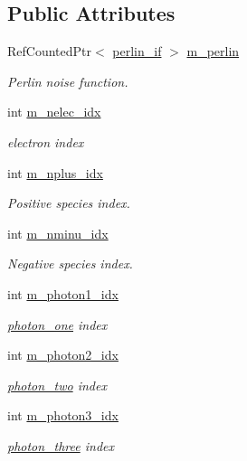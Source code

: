 \subsection*{Public Attributes}
\begin{DoxyCompactItemize}
\item 
Ref\+Counted\+Ptr$<$ \hyperlink{classperlin__if}{perlin\+\_\+if} $>$ \hyperlink{classmorrow__lowke_a50cd9e910b47a7cc00e6a9d37e2657fb}{m\+\_\+perlin}
\begin{DoxyCompactList}\small\item\em Perlin noise function. \end{DoxyCompactList}\item 
int \hyperlink{classmorrow__lowke_ac60d0a976425a8c6dfa660a7be9b198b}{m\+\_\+nelec\+\_\+idx}
\begin{DoxyCompactList}\small\item\em electron index \end{DoxyCompactList}\item 
int \hyperlink{classmorrow__lowke_a47d6f6f847f9c547b7ce88fabd3b6e03}{m\+\_\+nplus\+\_\+idx}
\begin{DoxyCompactList}\small\item\em Positive species index. \end{DoxyCompactList}\item 
int \hyperlink{classmorrow__lowke_ade9274cb10c38f6b6165b7a78bc20ddc}{m\+\_\+nminu\+\_\+idx}
\begin{DoxyCompactList}\small\item\em Negative species index. \end{DoxyCompactList}\item 
int \hyperlink{classmorrow__lowke_ad96cda8f8460278fc3b4847242aeb43f}{m\+\_\+photon1\+\_\+idx}
\begin{DoxyCompactList}\small\item\em \hyperlink{classmorrow__lowke_1_1photon__one}{photon\+\_\+one} index \end{DoxyCompactList}\item 
int \hyperlink{classmorrow__lowke_a91423165837de0753506cfccdb151eda}{m\+\_\+photon2\+\_\+idx}
\begin{DoxyCompactList}\small\item\em \hyperlink{classmorrow__lowke_1_1photon__two}{photon\+\_\+two} index \end{DoxyCompactList}\item 
int \hyperlink{classmorrow__lowke_af0d19f1bab5cc533a71f4e70d0c515f0}{m\+\_\+photon3\+\_\+idx}
\begin{DoxyCompactList}\small\item\em \hyperlink{classmorrow__lowke_1_1photon__three}{photon\+\_\+three} index \end{DoxyCompactList}\item 

\end{DoxyCompactItemize}
